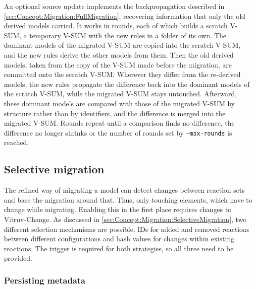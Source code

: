 An optional source update implements the backpropagation described in \autoref{sec:Concept:Migration:FullMigration}, recovering information that only the old derived models carried.
It works in rounds, each of which builds a scratch V-SUM, a temporary V-SUM with the new rules in a folder of its own.
The dominant models of the migrated V-SUM are copied into the scratch V-SUM, and the new rules derive the other models from them.
Then the old derived models, taken from the copy of the V-SUM made before the migration, are committed onto the scratch V-SUM.
Wherever they differ from the re-derived models, the new rules propagate the difference back into the dominant models of the scratch V-SUM, while the migrated V-SUM stays untouched.
Afterward, these dominant models are compared with those of the migrated V-SUM by structure rather than by identifiers, and the difference is merged into the migrated V-SUM.
Rounds repeat until a comparison finds no difference, the difference no longer shrinks or the number of rounds set by \texttt{--max-rounds} is reached.

\subsection{Selective migration}
\label{sec:Implementation:Migration:SelectiveMigration}

The refined way of migrating a model can detect changes between reaction sets and base the migration around that.
Thus, only touching elements, which have to change while migrating.
Enabling this in the first place requires changes to Vitruv-Change\cite{vitruv-change-fork}.
As discussed in \autoref{sec:Concept:Migration:SelectiveMigration}, two different selection mechanisms are possible.
IDs for added and removed reactions between different configurations and hash values for changes within existing reactions.
The trigger is required for both strategies, so all three need to be provided.

\subsubsection{Persisting metadata}
\label{sec:Implementation:Migration:SelectiveMigration:PersistingMetadata}

